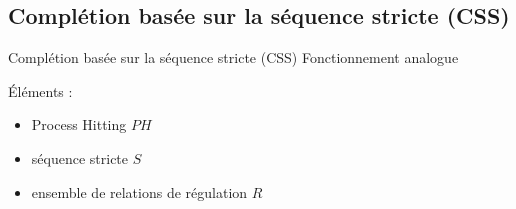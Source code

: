 \documentclass[french]{beamer}
\begin{document}
\subsection{Complétion basée sur la séquence stricte (CSS)}
\begin{frame}{Complétion basée sur la séquence stricte (CSS)}
Fonctionnement analogue

\vspace{1cm}
Éléments :
\begin{itemize}
\item Process Hitting $PH$
\item séquence stricte $S$
\item ensemble de relations de régulation $R$
\end{itemize}
\end{frame}
\end{document}

